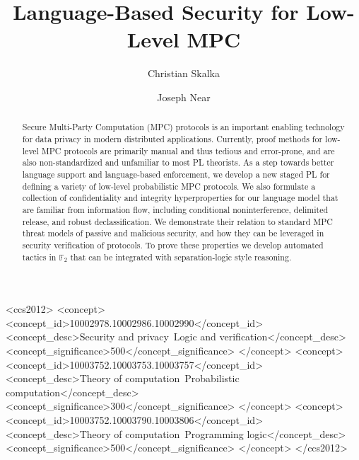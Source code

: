 \documentclass[sigconf]{acmart}
\begin{document}
\title{Language-Based Security for Low-Level MPC}

\author{Christian Skalka}

\author{Joseph Near}

\begin{abstract}
  Secure Multi-Party Computation (MPC) protocols is an important
  enabling technology for data privacy in modern distributed
  applications. Currently, proof methods for low-level MPC protocols
  are primarily manual and thus tedious and error-prone, and are also
  non-standardized and unfamiliar to most PL theorists. As a step
  towards better language support and language-based enforcement, we
  develop a new staged PL for defining a variety of low-level
  probabilistic MPC protocols. We also formulate a collection of
  confidentiality and integrity hyperproperties for our language model
  that are familiar from information flow, including conditional
  noninterference, delimited release, and robust declassification. We
  demonstrate their relation to standard MPC threat models of passive
  and malicious security, and how they can be leveraged in security
  verification of protocols. To prove these properties we develop
  automated tactics in $\mathbb{F}_2$ that can be integrated with
  separation-logic style reasoning.
\end{abstract}

\begin{CCSXML}
<ccs2012>
   <concept>
       <concept_id>10002978.10002986.10002990</concept_id>
       <concept_desc>Security and privacy~Logic and verification</concept_desc>
       <concept_significance>500</concept_significance>
       </concept>
   <concept>
       <concept_id>10003752.10003753.10003757</concept_id>
       <concept_desc>Theory of computation~Probabilistic computation</concept_desc>
       <concept_significance>300</concept_significance>
       </concept>
   <concept>
       <concept_id>10003752.10003790.10003806</concept_id>
       <concept_desc>Theory of computation~Programming logic</concept_desc>
       <concept_significance>500</concept_significance>
       </concept>
 </ccs2012>
\end{CCSXML}
\end{document}
